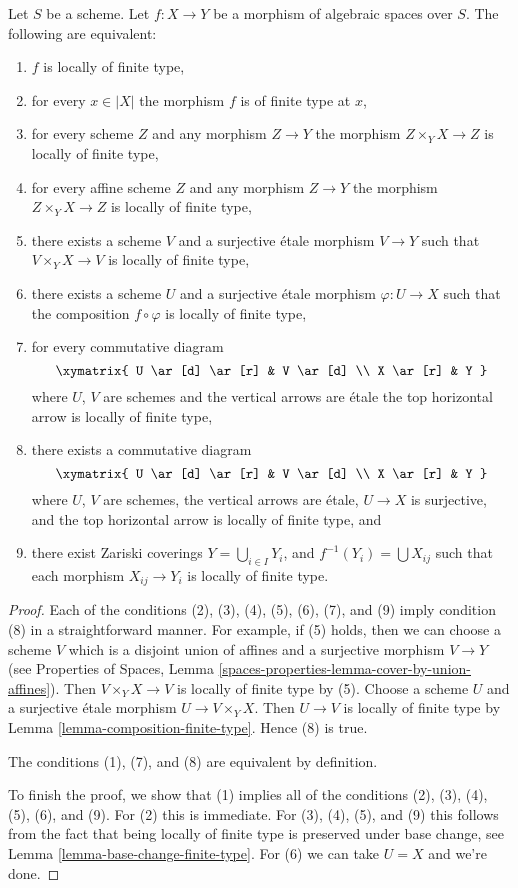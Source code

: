 \begin{lemma}
\label{lemma-finite-type-local}
Let $S$ be a scheme.
Let $f : X \to Y$ be a morphism of algebraic spaces over $S$.
The following are equivalent:
\begin{enumerate}
\item $f$ is locally of finite type,
\item for every $x \in |X|$ the morphism $f$ is of finite type at $x$,
\item for every scheme $Z$ and any morphism $Z \to Y$ the morphism
$Z \times_Y X \to Z$ is locally of finite type,
\item for every affine scheme $Z$ and any morphism
$Z \to Y$ the morphism $Z \times_Y X \to Z$ is locally of finite type,
\item there exists a scheme $V$ and a surjective \'etale morphism
$V \to Y$ such that $V \times_Y X \to V$ is locally of finite type,
\item there exists a scheme $U$ and a surjective \'etale morphism
$\varphi : U \to X$ such that the composition $f \circ \varphi$
is locally of finite type,
\item for every commutative diagram
$$
\xymatrix{
U \ar[d] \ar[r] & V \ar[d] \\
X \ar[r] & Y
}
$$
where $U$, $V$ are schemes and the vertical arrows are \'etale
the top horizontal arrow is locally of finite type,
\item there exists a commutative diagram
$$
\xymatrix{
U \ar[d] \ar[r] & V \ar[d] \\
X \ar[r] & Y
}
$$
where $U$, $V$ are schemes, the vertical arrows are \'etale, $U \to X$
is surjective, and the top horizontal arrow is locally of finite type, and
\item there exist Zariski coverings $Y = \bigcup_{i \in I} Y_i$,
and $f^{-1}(Y_i) = \bigcup X_{ij}$ such that
each morphism $X_{ij} \to Y_i$ is locally of finite type.
\end{enumerate}
\end{lemma}

\begin{proof}
Each of the conditions (2), (3), (4), (5), (6), (7), and (9)
imply condition (8) in a straightforward manner. For example, if
(5) holds, then we can choose a scheme $V$ which is a disjoint
union of affines and a surjective morphism $V \to Y$
(see Properties of Spaces, Lemma
\ref{spaces-properties-lemma-cover-by-union-affines}).
Then $V \times_Y X \to V$ is locally of finite type by (5).
Choose a scheme $U$ and a surjective \'etale morphism
$U \to V \times_Y X$. Then $U \to V$ is locally of finite
type by Lemma \ref{lemma-composition-finite-type}.
Hence (8) is true.

\medskip\noindent
The conditions (1), (7), and (8) are equivalent by definition.

\medskip\noindent
To finish the proof, we show that (1) implies all of the conditions
(2), (3), (4), (5), (6), and (9). For (2) this is immediate.
For (3), (4), (5), and (9) this follows from the fact that being
locally of finite type is preserved under base change, see
Lemma \ref{lemma-base-change-finite-type}.
For (6) we can take $U = X$ and we're done.
\end{proof}

